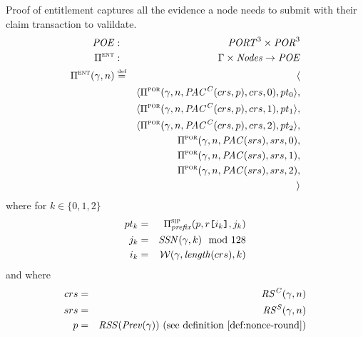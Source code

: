 \begin{definition}
\label{def:poe}
Proof of entitlement captures all the evidence a node needs to submit with their claim transaction to valildate. 
%
\begin{eqnarray}
\mathit{POE}&:&\mathit{PORT}^3\times\mathit{POR}^3\\
\Pi^{\textsc{ent}}&:&\Gamma\times\mathit{Nodes}\to\mathit{POE}\\
\Pi^{\textsc{ent}}(\gamma,n)&\overset{\textrm{\tiny def}}{=}&\langle\\
&&\langle\Pi^{\textsc{por}}(\gamma,n,\mathit{PAC^C}(crs,p), crs,0),pt_0\rangle,\\
&&\langle\Pi^{\textsc{por}}(\gamma,n,\mathit{PAC^C}(crs,p),crs,1),pt_1\rangle,\\
&&\langle\Pi^{\textsc{por}}(\gamma,n,\mathit{PAC^C}(crs,p),crs,2),pt_2\rangle,\\
&&\Pi^{\textsc{por}}(\gamma,n,\mathit{PAC}(srs),srs,0),\\
&&\Pi^{\textsc{por}}(\gamma,n,\mathit{PAC}(srs),srs,1),\\
&&\Pi^{\textsc{por}}(\gamma,n,\mathit{PAC}(srs),srs,2),\\
&&\rangle
\end{eqnarray}
where for $k\in\{0,1,2\}$
\begin{eqnarray}
pt_k&=& {\Pi^{\textsc{sip}}_\mathit{prefix}}(p,r\texttt{[}\/i_k\/\texttt{]},j_k)\\
j_k & = & \mathit{SSN}(\gamma,k)\mod 128\\
i_k & = & \mathcal{W}(\gamma,\mathit{length}(crs),k)
\end{eqnarray}
and where 
\begin{eqnarray}
crs& = & \mathit{RS^C}(\gamma, n)\\
srs & = & \mathit{RS^S}(\gamma, n)\\
p & = & \mathit{RSS}(\mathit{Prev}(\gamma)) \text{ (see definition \ref{def:nonce-round})}
\end{eqnarray}
\end{definition}




